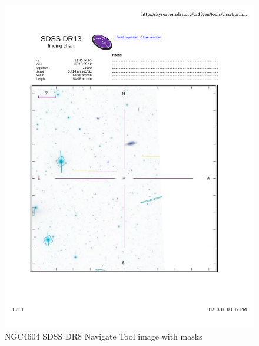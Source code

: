 \documentclass[10pt,letterpaper]{article}
\begin{document}
\begin{figure}[h!]
\centering
\includegraphics[scale=0.7]{figures/NGC4604.pdf}
\caption{NGC4604 SDSS DR8 Navigate Tool image with masks}
\end{figure}
\end{document}

